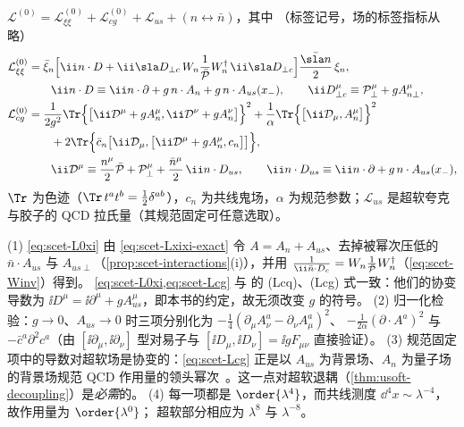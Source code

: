 \begin{definition}\label{def:scet-lagrangian}
$\mathcal L^{(0)}=\mathcal L^{(0)}_{\xi\xi}+\mathcal L^{(0)}_{cg}+\mathcal L_{us}+(n\leftrightarrow\bar n)$，其中
（标签记号，场的标签指标从略）
\begin{align}
\mathcal L^{(0)}_{\xi\xi}&=\bar\xi_n\Big[\ii n\cdot D+\ii\sla D_{\perp c}\,W_n\frac{1}{\Pbar}W_n^\dagger\,\ii\sla D_{\perp c}\Big]\frac{\nbslash}{2}\,\xi_n,
\label{eq:scet-L0xi}\\
&\qquad \ii n\cdot D\equiv\ii n\cdot\partial+g\,n\cdot A_n+g\,n\cdot A_{us}(x_-),\qquad \ii D^\mu_{\perp c}\equiv\Pperp^\mu+gA^\mu_{n\perp},\notag\\
\mathcal L^{(0)}_{cg}&=\frac{1}{2g^2}\Tr\Big\{\big[\ii\mathcal D^\mu+gA_n^\mu,\ii\mathcal D^\nu+gA_n^\nu\big]\Big\}^2
+\frac1\alpha\Tr\Big\{\big[\ii\mathcal D_\mu,A_n^\mu\big]\Big\}^2\notag\\
&\qquad+2\Tr\Big\{\bar c_n\big[\ii\mathcal D_\mu,\big[\ii\mathcal D^\mu+gA_n^\mu,c_n\big]\big]\Big\},\label{eq:scet-Lcg}\\
&\qquad \ii\mathcal D^\mu\equiv\frac{n^\mu}{2}\Pbar+\Pperp^\mu+\frac{\bar n^\mu}{2}\,\ii n\cdot D_{us},\qquad
\ii n\cdot D_{us}\equiv\ii n\cdot\partial+g\,n\cdot A_{us}(x_-),\notag
\end{align}
$\Tr$ 为色迹（$\Tr\,t^at^b=\frac12\delta^{ab}$），$c_n$ 为共线鬼场，$\alpha$ 为规范参数；$\mathcal L_{us}$ 是超软夸克与胶子的
QCD 拉氏量（其规范固定可任意选取）。
\end{definition}

\begin{remark}
(1) \cref{eq:scet-L0xi} 由 \cref{eq:scet-Lxixi-exact} 令 $A=A_n+A_{us}$、去掉被幂次压低的 $\bar n\cdot A_{us}$ 与
$A_{us\perp}$（\cref{prop:scet-interactions}(i)），并用 $\frac{1}{\ii\bar n\cdot D_c}=W_n\frac1{\Pbar}W_n^\dagger$（\cref{eq:scet-Winv}）得到。
\cref{eq:scet-L0xi,eq:scet-Lcg} 与 \cite{BauerPirjolStewart2002} 的 (Lcq)、(Lcg) 式一致：他们的协变导数为
$\ii D^\mu=\ii\partial^\mu+gA^\mu_{us}$，即本书的约定，故无须改变 $g$ 的符号。
(2) 归一化检验：$g\to0$、$A_{us}\to0$ 时三项分别化为 $-\frac14(\partial_\mu A^a_\nu-\partial_\nu A^a_\mu)^2$、
$-\frac{1}{2\alpha}(\partial\cdot A^a)^2$ 与 $-\bar c^a\partial^2c^a$（由 $[\ii\partial_\mu,\ii\partial_\nu]$ 型对易子与
$[\ii D_\mu,\ii D_\nu]=\ii gF_{\mu\nu}$ 直接验证）。
(3) 规范固定项中的导数对超软场是协变的：\cref{eq:scet-Lcg} 正是以 $A_{us}$ 为背景场、$A_n$ 为量子场的背景场规范
QCD 作用量的领头幂次~\cite{BauerPirjolStewart2002}。这一点对超软退耦（\cref{thm:usoft-decoupling}）是\emph{必需}的。
(4) 每一项都是 $\order{\lambda^4}$，而共线测度 $\dd^4x\sim\lambda^{-4}$，故作用量为 $\order{\lambda^0}$；
超软部分相应为 $\lambda^8$ 与 $\lambda^{-8}$。
\end{remark}

